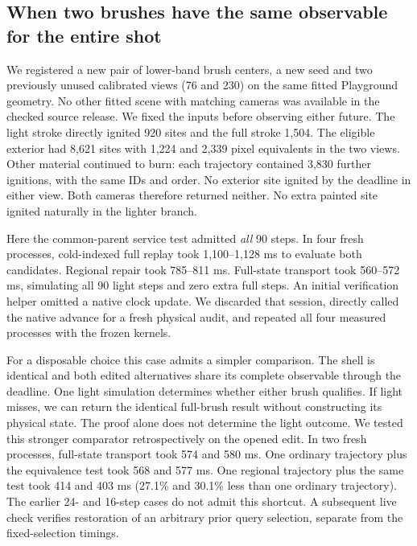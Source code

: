 \subsection{When two brushes have the same observable for the entire shot}
We registered a new pair of lower-band brush centers, a new seed and two previously unused calibrated views (76 and 230) on the same fitted Playground geometry. No other fitted scene with matching cameras was available in the checked source release. We fixed the inputs before observing either future. The light stroke directly ignited 920 sites and the full stroke 1,504. The eligible exterior had 8,621 sites with 1,224 and 2,339 pixel equivalents in the two views. Other material continued to burn: each trajectory contained 3,830 further ignitions, with the same IDs and order. No exterior site ignited by the deadline in either view. Both cameras therefore returned neither. No extra painted site ignited naturally in the lighter branch.

Here the common-parent service test admitted \emph{all} 90 steps. In four fresh processes, cold-indexed full replay took 1,100--1,128 ms to evaluate both candidates. Regional repair took 785--811 ms. Full-state transport took 560--572 ms, simulating all 90 light steps and zero extra full steps. An initial verification helper omitted a native clock update. We discarded that session, directly called the native advance for a fresh physical audit, and repeated all four measured processes with the frozen kernels.

For a disposable choice this case admits a simpler comparison. The shell is identical and both edited alternatives share its complete observable through the deadline. One light simulation determines whether either brush qualifies. If light misses, we can return the identical full-brush result without constructing its physical state. The proof alone does not determine the light outcome. We tested this stronger comparator retrospectively on the opened edit. In two fresh processes, full-state transport took 574 and 580 ms. One ordinary trajectory plus the equivalence test took 568 and 577 ms. One regional trajectory plus the same test took 414 and 403 ms (27.1\% and 30.1\% less than one ordinary trajectory). The earlier 24- and 16-step cases do not admit this shortcut. A subsequent live check verifies restoration of an arbitrary prior query selection, separate from the fixed-selection timings.
